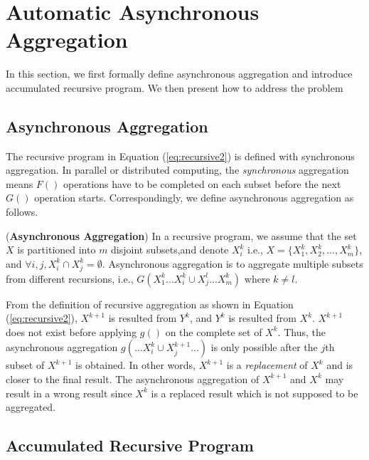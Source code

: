 \section{Automatic Asynchronous Aggregation}
\label{sec:async}
In this section, we first formally define asynchronous aggregation and introduce accumulated recursive program. We then present how to address the problem 

\subsection{Asynchronous Aggregation}
\label{sec:async:async}

The recursive program in Equation (\ref{eq:recursive2}) is defined with synchronous aggregation. In parallel or distributed computing, the \emph{synchronous} aggregation means $F()$ operations have to be completed on each subset before the next $G()$ operation starts. %
Correspondingly, we define asynchronous aggregation as follows.

\begin{definition}
	\label{def:asyncaggre}
	(\textbf{Asynchronous Aggregation}) In a recursive program, we assume that the set $X$  is partitioned into $m$ disjoint subsets,and denote $X_i^k$ i.e., $X=\{X_1^k,X_2^k,\ldots,X_m^k\}$, and $\forall i,j, X_i^k\cap X_j^k=\emptyset$. Asynchronous aggregation is to aggregate multiple subsets from different recursions, i.e., $G(X_1^k \ldots X_i^k\cup X_j^{l}...X_m^k)$ where $k\neq l$.
\end{definition}

From the definition of recursive aggregation as shown in Equation (\ref{eq:recursive2}), $X^{k+1}$ is resulted from $Y^k$, and $Y^k$ is resulted from $X^k$. $X^{k+1}$ does not exist before applying $g()$ on the complete set of $X^k$. Thus, the asynchronous aggregation $g(\ldots X_i^k\cup X_j^{k+1} \ldots)$ is only possible after the $j$th subset of $X^{k+1}$ is obtained. In other words, $X^{k+1}$ is a \emph{replacement} of $X^k$ and is closer to the final result. The asynchronous aggregation of $X^{k+1}$ and $X^k$ may result in a wrong result since $X^k$ is a replaced result which is not supposed to be aggregated.

\subsection{Accumulated Recursive Program}
\label{sec:async:accrec}

